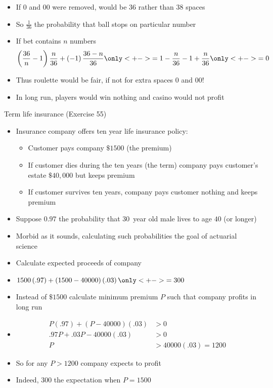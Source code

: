 \documentclass[handout]{beamer}
\theoremstyle{definition}
\begin{document}
\begin{frame}
\begin{itemize}
\item If $0$ and $00$ were removed, would be $36$ rather than $38$ spaces
\item So $\frac{1}{36}$ the probability that ball stops on particular number
\item If bet contains $n$ numbers
\[\left(\frac{36}{n}-1\right)\frac{n}{36}
+\left(-1\right)\frac{36-n}{36}
\only<+->{=1-\frac{n}{36}-1+\frac{n}{36}}
\only<+->{=0}\]
\item Thus roulette would be fair, if not for extra spaces $0$ and $00$!
\item In long run, players would win nothing and casino would not profit
\end{itemize}
\end{frame}

\begin{frame}{Term life insurance (Exercise 55)}
\begin{itemize}
\item Insurance company offers \alert{ten year life
insurance policy}:
\begin{itemize}
\item Customer pays company $\$1500$ (the \alert{premium})
\item If customer dies during the ten years
(the \alert{term}) company pays customer's estate
$\$40,000$ but keeps premium
\item If customer survives ten years, company pays customer
nothing and keeps premium
\end{itemize}
\item Suppose $0.97$ the
probability that 30~year old male lives to age $40$ (or longer)
\item Morbid as it sounds, calculating such probabilities
the goal of \alert{actuarial science}
\item Calculate expected proceeds of company
\end{itemize}
\end{frame}

\begin{frame}
\begin{itemize}
\item $1500\left(.97\right)+\left(1500-40000\right)\left(.03\right)
\only<+->{=300}$
\item Instead of $\$1500$ calculate \alert{minimum}
premium $P$ such that company profits in long run
\item[]
\begin{align*}
P\left(.97\right)+\left(P-40000\right)\left(.03\right)&>0\\
.97P+.03P-40000\left(.03\right)&>0\\
P&>40000\left(.03\right)=1200
\end{align*}
\item So for any $P>1200$ company expects to profit
\item Indeed, $300$ the expectation when $P=1500$
\end{itemize}
\end{frame}
\end{document}
